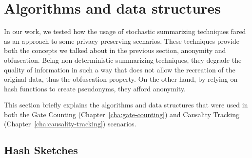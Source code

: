 
\section{Algorithms and data structures}
\label{sec:algorithms_and_data_structures}
In our work, we tested how the usage of stochastic summarizing
techniques fared as an approach to some privacy preserving
scenarios. These techniques provide both the concepts we talked about
in the previous section, anonymity and obfuscation. Being
non-deterministic summarizing techniques, they degrade the quality of
information in such a way that does not allow the recreation of the
original data, thus the obfuscation property. On the other hand, by
relying on hash functions to create pseudonyms, they afford anonymity.

This section briefly explains the algorithms
and data structures that were used in both the Gate Counting
(Chapter~\ref{cha:gate-counting}) and Causality Tracking
(Chapter~\ref{cha:causality-tracking}) scenarios.

\subsection{Hash Sketches}
\label{sec:hash_sketches}

